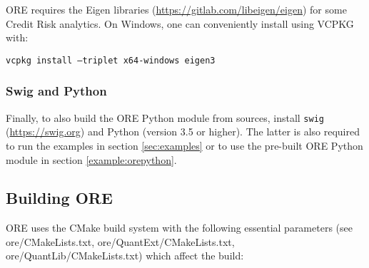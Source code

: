 ORE requires the Eigen libraries (\url{https://gitlab.com/libeigen/eigen}) for some Credit Risk analytics.
On Windows, one can conveniently install using VCPKG with:

\medskip
{\tt vcpkg install --triplet x64-windows eigen3}

\subsubsection*{Swig and Python}

Finally, to also build the ORE Python module from sources, install {\tt swig} (\url{https://swig.org}) and
Python (version 3.5 or higher). The latter is also required to run the examples in section \ref{sec:examples}
or to use the pre-built ORE Python module in section \ref{example:orepython}. 

\subsection{Building ORE}\label{sec:build}

ORE uses the CMake build system with the following essential parameters (see ore/CMakeLists.txt,
ore/QuantExt/CMakeLists.txt, ore/QuantLib/CMakeLists.txt) which affect the build:

